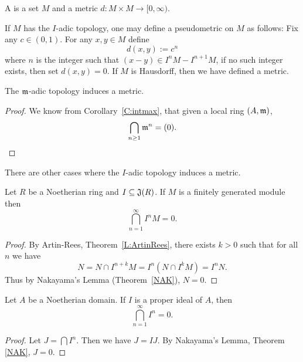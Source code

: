 \documentclass{ximera}
\begin{document}
\begin{definition}
  A  is a set $M$ and a metric $d:M\times M \to
  [0,\infty)$.
\end{definition}

If $M$ has the $I$-adic topology, one may define a
pseudometric on $M$ as follows: Fix any $c\in
(0,1)$. For any $x,y\in M$ define
\[
d(x,y) := c^n
\]
where $n$ is the integer such that $(x-y)\in I^nM-I^{n+1}M$, if no
such integer exists, then set $d(x,y) = 0$. If $M$ is
Hausdorff, then we have defined a metric.


\begin{corollary}
  The $\mathfrak{m}$-adic topology induces a metric.
  \begin{proof}
    We know from Corollary~\ref{C:intmax}, that given a local ring $(A,\mathfrak{m})$,
    \[
    \bigcap_{n\ge 1} \mathfrak{m}^n  = (0).
    \]
  \end{proof}
\end{corollary}

There are other cases where the $I$-adic topology induces a metric.

\begin{corollary}
  Let $R$ be a Noetherian ring and $I \subseteq \mathfrak J(R)$. If $M$ is a
  finitely generated module then
  \[
  \bigcap_{n=1}^\infty I^n M = 0.
  \]
  \begin{proof}
    By Artin-Rees, Theorem~\ref{L:ArtinRees}, there
    exists $k > 0$ such that for all $n$ we have
    \[
    N = N \cap I^{n + k}M = I^n(N \cap I^kM) = I^nN.
    \]
    Thus by Nakayama's Lemma
    (Theorem~\ref{NAK}), $N = 0$.
  \end{proof}
\end{corollary}


\begin{corollary}
  Let $A$ be a Noetherian domain. If $I$ is a proper ideal of $A$,
  then
  \[
  \bigcap_{n=1}^\infty I^n = 0.
  \]
  \begin{proof}
    Let $J = \bigcap I^n$.  Then we have $J = I J$.  By Nakayama's
    Lemma, Theorem \ref{NAK}, $J = 0$.
  \end{proof}
\end{corollary}
\end{document}
